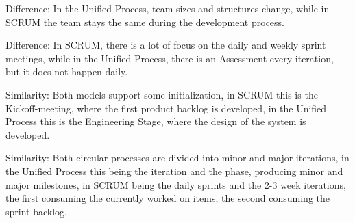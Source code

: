 \documentclass[11pt,a4paper]{article}
\begin{document}
Difference: In the Unified Process, team sizes and structures change,
while in SCRUM the team stays the same during the development process.

Difference: In SCRUM, there is a lot of focus on the daily and weekly
sprint meetings, while in the Unified Process, there is an Assessment
every iteration, but it does not happen daily.

Similarity: Both models support some initialization, in SCRUM this is
the Kickoff-meeting, where the first product backlog is developed, in
the Unified Process this is the Engineering Stage, where the design of
the system is developed.

Similarity: Both circular processes are divided into minor and major
iterations, in the Unified Process this being the iteration and the phase,
producing minor and major milestones, in SCRUM being the daily sprints
and the 2-3 week iterations, the first consuming the currently worked
on items, the second consuming the sprint backlog.
\end{document}
